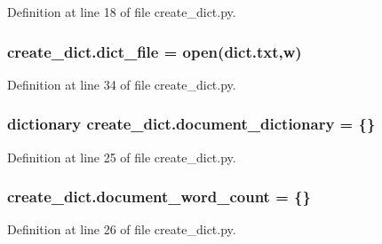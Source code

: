 Definition at line 18 of file create\+\_\+dict.\+py.

\subsubsection[{\texorpdfstring{dict\+\_\+file}{dict_file}}]{\setlength{\rightskip}{0pt plus 5cm}create\+\_\+dict.\+dict\+\_\+file = open(\textquotesingle{}dict.\+txt\textquotesingle{},\textquotesingle{}w\textquotesingle{})}\hypertarget{namespacecreate__dict_ac24c44c9b8b29bc8a8411916d7a6b349}{}\label{namespacecreate__dict_ac24c44c9b8b29bc8a8411916d7a6b349}


Definition at line 34 of file create\+\_\+dict.\+py.

\subsubsection[{\texorpdfstring{document\+\_\+dictionary}{document_dictionary}}]{\setlength{\rightskip}{0pt plus 5cm}dictionary create\+\_\+dict.\+document\+\_\+dictionary = \{\}}\hypertarget{namespacecreate__dict_a523b5abb183f92cbb473ab778d8c7d9f}{}\label{namespacecreate__dict_a523b5abb183f92cbb473ab778d8c7d9f}


Definition at line 25 of file create\+\_\+dict.\+py.

\subsubsection[{\texorpdfstring{document\+\_\+word\+\_\+count}{document_word_count}}]{\setlength{\rightskip}{0pt plus 5cm}create\+\_\+dict.\+document\+\_\+word\+\_\+count = \{\}}\hypertarget{namespacecreate__dict_afb09c644d11be14d22d9c194ce8904fb}{}\label{namespacecreate__dict_afb09c644d11be14d22d9c194ce8904fb}


Definition at line 26 of file create\+\_\+dict.\+py.

